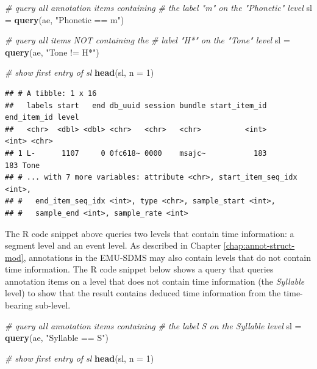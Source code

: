 \documentclass[]{book}
\newenvironment{Shaded}{\begin{snugshade}}{\end{snugshade}}
\newcommand{\CommentTok}[1]{\textcolor[rgb]{0.56,0.35,0.01}{\textit{#1}}}
\newcommand{\DataTypeTok}[1]{\textcolor[rgb]{0.13,0.29,0.53}{#1}}
\newcommand{\DecValTok}[1]{\textcolor[rgb]{0.00,0.00,0.81}{#1}}
\newcommand{\KeywordTok}[1]{\textcolor[rgb]{0.13,0.29,0.53}{\textbf{#1}}}
\newcommand{\NormalTok}[1]{#1}
\newcommand{\StringTok}[1]{\textcolor[rgb]{0.31,0.60,0.02}{#1}}
\begin{document}
\begin{Shaded}
\begin{Highlighting}[]
\CommentTok{# query all annotation items containing}
\CommentTok{# the label "m" on the "Phonetic" level}
\NormalTok{sl =}\StringTok{ }\KeywordTok{query}\NormalTok{(ae, }\StringTok{"Phonetic == m"}\NormalTok{)}

\CommentTok{# query all items NOT containing the}
\CommentTok{# label "H*" on the "Tone" level}
\NormalTok{sl =}\StringTok{ }\KeywordTok{query}\NormalTok{(ae, }\StringTok{"Tone != H*"}\NormalTok{)}

\CommentTok{# show first entry of sl}
\KeywordTok{head}\NormalTok{(sl, }\DataTypeTok{n =} \DecValTok{1}\NormalTok{)}
\end{Highlighting}
\end{Shaded}

\begin{verbatim}
## # A tibble: 1 x 16
##   labels start   end db_uuid session bundle start_item_id end_item_id level
##   <chr>  <dbl> <dbl> <chr>   <chr>   <chr>          <int>       <int> <chr>
## 1 L-      1107     0 0fc618~ 0000    msajc~           183         183 Tone 
## # ... with 7 more variables: attribute <chr>, start_item_seq_idx <int>,
## #   end_item_seq_idx <int>, type <chr>, sample_start <int>,
## #   sample_end <int>, sample_rate <int>
\end{verbatim}

The R code snippet above queries two levels that contain time information: a segment level and an event level. As described in Chapter \ref{chap:annot-struct-mod}, annotations in the EMU-SDMS may also contain levels that do not contain time information. The R code snippet below shows a query that queries annotation items on a level that does not contain time information (the \emph{Syllable} level) to show that the result contains deduced time information from the time-bearing sub-level.

\begin{Shaded}
\begin{Highlighting}[]
\CommentTok{# query all annotation items containing}
\CommentTok{# the label S on the Syllable level}
\NormalTok{sl =}\StringTok{ }\KeywordTok{query}\NormalTok{(ae, }\StringTok{"Syllable == S"}\NormalTok{)}

\CommentTok{# show first entry of sl}
\KeywordTok{head}\NormalTok{(sl, }\DataTypeTok{n =} \DecValTok{1}\NormalTok{)}
\end{Highlighting}
\end{Shaded}
\end{document}
